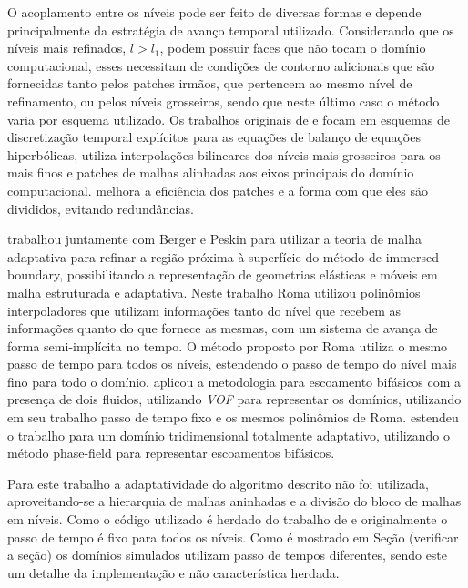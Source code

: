 O acoplamento entre os níveis pode ser feito de diversas formas e depende principalmente da estratégia de avanço temporal utilizado. Considerando que os níveis mais refinados, $l>l_1$, podem possuir faces que não tocam o domínio computacional, esses necessitam de condições de contorno adicionais que são fornecidas tanto pelos patches irmãos, que pertencem ao mesmo nível de refinamento, ou pelos níveis grosseiros, sendo que neste último caso o método varia por esquema utilizado. Os trabalhos originais de \citet{Berger1984} e \citet{Berger1989} focam em esquemas de discretização temporal explícitos para as equações de balanço de equações hiperbólicas, \citet{Berger1989} utiliza interpolações bilineares dos níveis mais grosseiros para os mais finos e patches de malhas alinhadas aos eixos principais do domínio computacional. \citet{Berger1991} melhora a eficiência dos patches e a forma com que eles são divididos, evitando redundâncias.

\citet{Roma1996} trabalhou juntamente com Berger e Peskin para utilizar a teoria de malha adaptativa para refinar a região próxima à superfície do método de immersed boundary, possibilitando a representação de geometrias elásticas e móveis em malha estruturada e adaptativa. Neste trabalho Roma utilizou polinômios interpoladores que utilizam informações tanto do nível que recebem as informações quanto do que fornece as mesmas, com um sistema de avança de forma semi-implícita no tempo. O método proposto por Roma utiliza o mesmo passo de tempo para todos os níveis, estendendo o passo de tempo do nível mais fino para todo o domínio. \citet{Villar2007} aplicou a metodologia para escoamento bifásicos com a presença de dois fluidos, utilizando \textit{VOF} para representar os domínios, utilizando em seu trabalho passo de tempo fixo e os mesmos polinômios de Roma. \cite{Ceniceros2010} estendeu o trabalho para um domínio tridimensional totalmente adaptativo, utilizando o método phase-field para representar escoamentos bifásicos. 

Para este trabalho a adaptatividade do algoritmo descrito não foi utilizada, aproveitando-se a hierarquia de malhas aninhadas e a divisão do bloco de malhas em níveis. Como o código utilizado é herdado do trabalho de \citet{Villar2007} e originalmente o passo de tempo é fixo para todos os níveis. Como é mostrado em Seção (verificar a seção) os domínios simulados utilizam passo de tempos diferentes, sendo este um detalhe da implementação e não característica herdada. 

